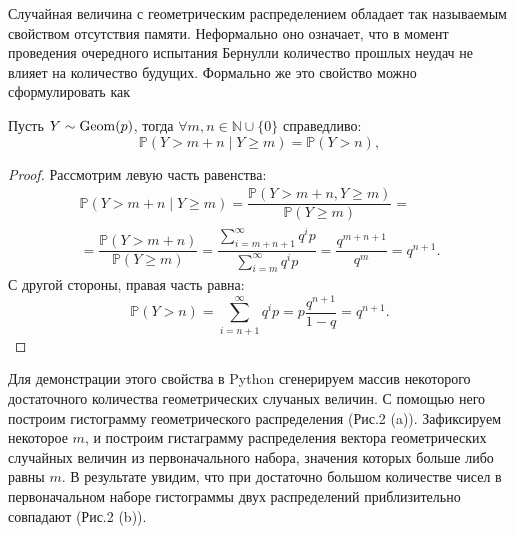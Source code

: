 Случайная величина с геометрическим распределением обладает так называемым
 свойством отсутствия памяти. Неформально оно означает, что в момент проведения
 очередного испытания Бернулли количество прошлых неудач не влияет на количество
 будущих. Формально же это свойство можно сформулировать как
\newtheorem{stat}{Утверждение}
\begin{statement}
	Пусть $Y \sim \operatorname{Geom}(p)$, тогда $\forall m,n \in \mathbb{N} \cup 
     \{0\}$ справедливо:
	$$ 
     \mathbb{P}(Y > m + n \mid Y \ge m) = \mathbb{P}(Y > n),
     $$
\end{statement}
\begin{proof} Рассмотрим левую часть равенства:
     \begin{multline*}
          \mathbb{P}(Y > m + n \mid Y \ge m) = \dfrac{\mathbb{P}
          (Y > m + n, Y \ge m)}{\mathbb{P}(Y \ge m)} = \\
          = \dfrac{\mathbb{P}(Y > m + n)}{\mathbb{P}(Y \ge m)} = 
          \dfrac{\displaystyle\sum_{i = m + n + 1}^\infty q^i p}
          {\displaystyle\sum_{i = m}^\infty q^i p} = \dfrac{q^{m + n + 1}}{q^m} =
          q^{n + 1}.
     \end{multline*}
     С другой стороны, правая часть равна:
     $$ 
     \mathbb{P}(Y > n) = \sum_{i = n + 1}^\infty q^i p = p \dfrac{q^{n + 1}}
     {1 - q} = q^{n + 1}.
     $$
\end{proof}

Для демонстрации этого свойства в Python сгенерируем массив некоторого
 достаточного количества геометрических случаных величин. С помощью него
 построим гистограмму геометрического распределения (Рис.2 (a)). Зафиксируем некоторое $m$,
 и построим гистаграмму распределения вектора геометрических случайных
 величин из первоначального набора, значения которых больше либо равны $m$.
 В результате увидим, что при достаточно большом количестве чисел в первоначальном
 наборе гистограммы двух распределений приблизительно совпадают (Рис.2 (b)). 


